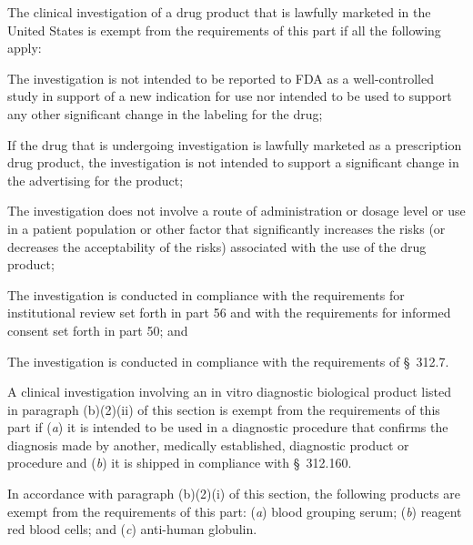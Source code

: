 \documentclass[11pt]{article}
\begin{document}
\begin{description}[leftmargin=0.5cm,style=sameline]
\item[(1)] The clinical investigation of a drug product that is lawfully marketed in the United States is exempt from the requirements of this part if all the following apply:

\begin{description}[leftmargin=0.8cm,style=sameline]
\item[(i)] The investigation is not intended to be reported to FDA as a well-controlled study in support of a new indication for use nor intended to be used to support any other significant change in the labeling for the drug;
\item[(ii)] If the drug that is undergoing investigation is lawfully marketed as a prescription drug product, the investigation is not intended to support a significant change in the advertising for the product;
\item[(iii)] The investigation does not involve a route of administration or dosage level or use in a patient population or other factor that significantly increases the risks (or decreases the acceptability of the risks) associated with the use of the drug product;
\item[(iv)] The investigation is conducted in compliance with the requirements for institutional review set forth in part 56 and with the requirements for informed consent set forth in part 50; and
\item[(v)] The investigation is conducted in compliance with the requirements of \S~312.7.
\end{description}

\item[(2)] \hfill
\begin{description}[leftmargin=0.8cm,style=sameline]
\item[(i)] A clinical investigation involving an in vitro diagnostic biological product listed in paragraph (b)(2)(ii) of this section is exempt from the requirements of this part if (\textit{a}) it is intended to be used in a diagnostic procedure that confirms the diagnosis made by another, medically established, diagnostic product or procedure and (\textit{b}) it is shipped in compliance with \S~312.160.
\item[(ii)] In accordance with paragraph (b)(2)(i) of this section, the following products are exempt from the requirements of this part: (\textit{a}) blood grouping serum; (\textit{b}) reagent red blood cells; and (\textit{c}) anti-human globulin.
\end{description}


\end{description}
\end{document}
